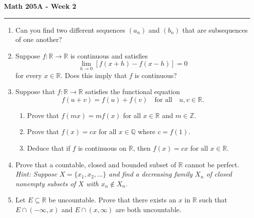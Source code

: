 \documentclass[11pt,letterpaper]{report}
\newcommand{\integers}{\mathbb{Z}}
\newcommand{\reals}{\mathbb{R}}
\newcommand{\rationals}{\mathbb{Q}}
\begin{document}
\begin{center}
{\bf \Large Math 205A - Week 2}
\vspace{0.2cm}
\hrule
\end{center}

\begin{enumerate}
	\item Can you find two different sequences $(a_n)$ and $(b_n)$ that are subsequences of one another?

	\vfill

	\item Suppose $f:\reals\to \reals$ is continuous and satisfies
	\[
	\lim_{h\to 0}[f(x+h)-f(x-h)] = 0
	\]
	for every $x\in \reals$. Does this imply that $f$ is continuous?

	\vfill

	\item Suppose that $f: \reals\to \reals$ satisfies the functional equation
	\[
	f(u+v) = f(u)+f(v)\quad\text{for all}\quad u,v\in \reals.
	\]
	\begin{enumerate}
		\item Prove that $f(mx) = mf(x)$ for all $x\in \reals$ and $m\in \integers$.
		\item Prove that $f(x) = cx$ for all $x\in \rationals$ where $c=f(1)$.
		\item Deduce that if $f$ is continuous on $\reals$, then $f(x) = cx$ for all $x\in \reals$.
	\end{enumerate}

	\vfill

	\item Prove that a countable, closed and bounded subset of $\reals$ cannot be perfect. \textit{Hint: Suppose $X = \{x_1, x_2, \ldots\}$ and find a decreasing family $X_n$ of closed nonempty subsets of $X$ with $x_n\notin X_n$.}

	\vfill
	

	

	\item Let $E\subseteq \reals$ be uncountable. Prove that there exists an $x$ in $\reals$ such that $E\cap (-\infty, x)$ and $E\cap (x, \infty)$ are both uncountable.

	\vfill
\end{enumerate}
\end{document}
